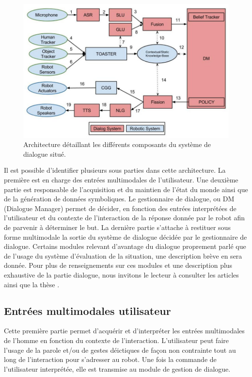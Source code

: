 \documentclass[a4paper,11pt,twoside]{StyleThese}
\begin{document}
\begin{figure}[ht!]
 \centering
  \includegraphics[width=0.99\linewidth]{./img/archiphase1.jpg} 
  \caption {Architecture détaillant les différents composants du système de dialogue situé.}
  \label{fig:archiphase1}
\end{figure}

Il est possible d'identifier plusieurs sous parties dans cette architecture.
La première est en charge des entrées multimodales de l'utilisateur. Une deuxième partie est responsable de l'acquisition et du maintien de l'état du monde ainsi que de la génération de données symboliques. Le gestionnaire de dialogue, ou DM (Dialogue Manager) permet de décider, en fonction des entrées interprétées de l'utilisateur et du contexte de l'interaction de la réponse donnée par le robot afin de parvenir à déterminer le but.
La dernière partie s'attache à restituer sous forme multimodale la sortie du système de dialogue décidée par le gestionnaire de dialogue.
Certains modules relevant d'avantage du dialogue proprement parlé que de l'usage du système d'évaluation de la situation, une description brève en sera donnée. Pour plus de renseignements sur ces modules et une description plus exhaustive de la partie dialogue, nous invitons le lecteur à consulter les articles \cite{Ferreira13a,Ferreira13b} ainsi que la thèse \cite{ferreira2015phd}.

\subsection{Entrées multimodales utilisateur}
\label{sec:entréesDial}
Cette première partie permet d'acquérir et d'interpréter les entrées multimodales de l'homme en fonction du contexte de l'interaction. L’utilisateur peut faire l’usage de la parole et/ou de gestes déictiques de façon non contrainte tout au long de l’interaction pour s’adresser au robot. Une fois la commande de l'utilisateur interprétée, elle est transmise au module de gestion de dialogue. 
\end{document}
